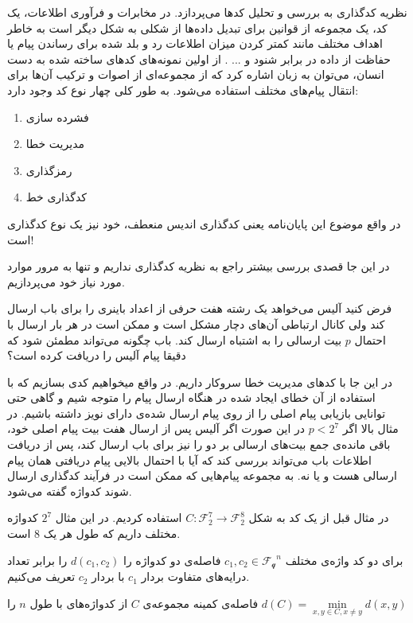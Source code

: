 نظریه کدگذاری به بررسی و تحلیل کد‌ها می‌پردازد. در مخابرات و فرآوری اطلاعات، یک کد، یک مجموعه‌ از قوانین برای تبدیل داده‌ها از شکلی به شکل دیگر است به خاطر اهداف مختلف مانند کمتر کردن میزان اطلاعات رد و بلد شده برای رساندن پیام یا حفاظت از داده در برابر شنود و ... . از اولین نمونه‌های کدهای ساخته شده به دست انسان، می‌توان به زبان اشاره کرد که از مجموعه‌ای از اصوات و ترکیب آن‌ها برای انتقال پیام‌های مختلف استفاده می‌شود. به طور کلی چهار نوع کد وجود دارد:
\begin{enumerate}
	\item
	فشرده سازی
	\item
	مدیریت خطا
	\item
	رمزگذاری
	\item
	کدگذاری خط
\end{enumerate}
\cite{wiki:coding1, wiki:coding2}

در واقع موضوع این پایان‌نامه یعنی کدگذاری اندیس منعطف، خود نیز یک نوع کدگذاری است!

در این جا قصدی بررسی بیشتر راجع به نظریه کدگذاری نداریم و تنها به مرور موارد مورد نیاز خود می‌پردازیم.
\begin{example}
	فرض کنید آلیس می‌خواهد یک رشته هفت حرفی از اعداد باینری را برای باب ارسال کند ولی کانال ارتباطی آن‌های دچار مشکل است و ممکن است در هر بار ارسال با احتمال
	$p$
	بیت ارسالی را به اشتباه ارسال کند. باب چگونه می‌تواند مطمئن شود که دقیقا پیام آلیس را دریافت کرده است؟
	
	در این جا با کدهای مدیریت خطا سروکار داریم. در واقع میخواهیم کدی بسازیم که با استفاده از آن خطای ایجاد شده در هنگاه ارسال پیام را متوجه شیم و گاهی حتی توانایی بازیابی پیام اصلی را از روی پیام ارسال شده‌ی دارای نویز داشته باشیم. در مثال بالا اگر
	$p < 2^7$
	در این صورت اگر آلیس پس از ارسال هفت بیت پیام اصلی خود، باقی مانده‌ی جمع بیت‌های ارسالی بر دو را نیز برای باب ارسال کند، پس از دریافت اطلاعات باب می‌تواند بررسی کند که آیا با احتمال بالایی پیام دریافتی همان پیام ارسالی هست و یا نه. به مجموعه‌ پیام‌هایی که ممکن است در فرآیند کدگذاری ارسال شوند کدواژه گفته می‌شود.
	
	در مثال قبل از یک کد به شکل
	$C: \mathcal{F}_2^7 \rightarrow \mathcal{F}_2^8$
	استفاده کردیم. در این مثال
	$2^7$
	کدواژه مختلف داریم که طول هر یک
	$8$
	است.
\end{example}

\begin{definition}
	برای دو کد واژه‌ی مختلف
	$c_1, c_2 \in \mathcal{F_q}^n$
	فاصله‌ی دو کدواژه را
	$d(c_1, c_2)$
	را برابر تعداد درایه‌های متفاوت بردار
	$c_1$
	با بردار
	$c_2$
	تعریف می‌کنیم.
	
	 فاصله‌‌ی کمینه مجموعه‌ی
	$C$
	از کدواژه‌های با طول
	$n$
	 را
	$d(C) = \min\limits_{x, y \in C, x \ne y} d(x, y)$
\end{definition}

